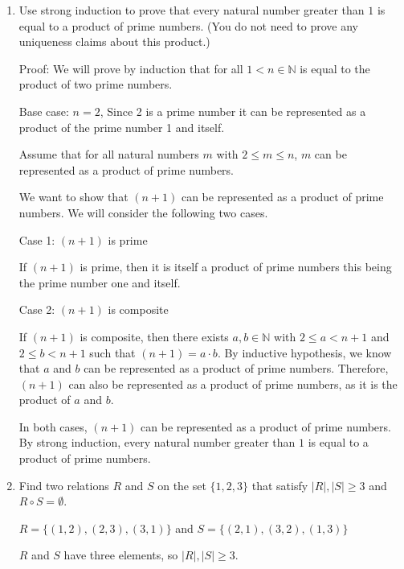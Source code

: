 \documentclass{article}
\newcommand{\bN}{\mathbb{N}}
\begin{document}
{\begin{enumerate}[labelindent=0pt,leftmargin=0pt]
    Thus $\prod_{k=2}^n\frac{k^2-1}{k^2}=\frac{n+1}{2n}$ holds for $n=k+1$ and the proof of the induction step is complete. 

    By induction the statement $\prod_{k=2}^n\frac{k^2-1}{k^2}=\frac{n+1}{2n}$ holds for all $n\geq 2$
    
  


    \item Use strong induction to prove that every natural number greater than $1$ is equal to a product of prime numbers. (You do not need to prove any uniqueness claims about this product.)

    Proof: We will prove by induction that for all $1 < n \in \bN$ is equal to the product of two prime numbers. 

    Base case: $n=2$, Since 2 is a prime number it can be represented as a product of the prime number 1 and itself. 

    Assume that for all natural numbers $m$ with $2 \leq m \leq n$, $m$ can be represented as a product of prime numbers.
 
    We want to show that $(n+1)$ can be represented as a product of prime numbers. We will consider the following two cases. 

    Case 1:  $(n+1)$ is prime

    If $(n+1)$ is prime, then it is itself a product of prime numbers this being the prime number one and itself.

    Case 2: $(n+1)$ is composite
    
    If $(n+1)$ is composite, then there exists $a,b \in\bN$ with $2 \leq a < n+1$ and $2 \leq b < n+1$ such that $(n+1) = a \cdot b$. 
    By inductive hypothesis, we know that $a$ and $b$ can be represented as a product of prime numbers. 
    Therefore, $(n+1)$ can also be represented as a product of prime numbers, as it is the product of $a$ and $b$.

    In both cases, $(n+1)$ can be represented as a product of prime numbers. By strong induction, every natural number greater than $1$ is equal to a product of prime numbers.




    \item Find two relations $R$ and $S$ on the set $\{1,2,3\}$ that satisfy $|R|,|S|\geq 3$ and $R\circ S=\emptyset$.

    $R = \{(1,2),(2,3),(3,1)\} $ and $S=\{(2,1),(3,2),(1,3)\}$

    $R$ and $S$ have three elements, so $|R|, |S| \geq 3$.


\end{enumerate}}
\end{document}
